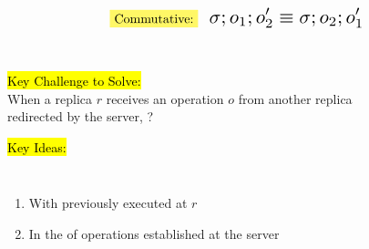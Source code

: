 \begin{frame}{}

  \begin{equation*}
    \text{\hl{Commutative:}\;\; \resizebox{0.35\textwidth}{!}{$\sigma; o_1; o_2' \equiv \sigma; o_2; o_1'$}}
  \end{equation*}

  \centerline{}
\end{frame}

\begin{frame}{}
  \begin{center}
     \\[8pt]

    \resizebox{0.75\textwidth}{!}{}
  \end{center}
\end{frame}

\begin{frame}{}
  \begin{center}
    \hl{Key Challenge to Solve:} \\[8pt]
    When a replica $r$ receives an operation $o$ from another replica \\ redirected by the server,
    ?
  
    \pause
    \vspace{0.80cm}

    \pause
    \vspace{0.80cm}

    \hl{Key Ideas:} \\[3pt]
    \begin{columns}
	\begin{enumerate}
	  \item With  previously executed at $r$
	  \item In the  of operations established at the server
	\end{enumerate}
    \end{columns}
  \end{center}
\end{frame}

